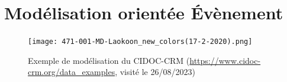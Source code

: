 \documentclass[a4paper,12pt,twoside]{book}
\begin{document}
\chapter{Modélisation orientée Évènement}\label{model-cidoc-crm}

\begin{figure}[h]
    \centering
    \texttt{[image: 471-001-MD-Laokoon\_new\_colors(17-2-2020).png]}
    \caption{Exemple de modélisation du CIDOC-CRM (\url{https://www.cidoc-crm.org/data_examples}, visité le 26/08/2023)}
    \label{fig:enter-label}
\end{figure}
   
	
	\backmatter





	\tableofcontents
	
\end{document}
